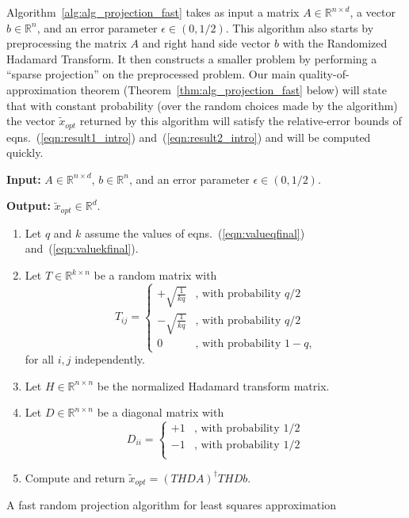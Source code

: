 \documentclass[11pt]{article}
\begin{document}
Algorithm~\ref{alg:alg_projection_fast} takes as input a matrix $A \in \mathbb{R}^{n \times d}$, a vector $b \in \mathbb{R}^n$, and an error parameter $\epsilon \in (0,1/2)$. This algorithm also starts by preprocessing the matrix $A$ and right hand side vector $b$ with the Randomized Hadamard Transform. It then constructs a smaller problem by performing a ``sparse projection'' on the preprocessed problem. Our main quality-of-approximation theorem (Theorem~\ref{thm:alg_projection_fast} below) will state that with constant probability (over the random choices made by the algorithm) the vector
$\tilde{x}_{opt}$ returned by this algorithm will satisfy the relative-error bounds of eqns.~(\ref{eqn:result1_intro}) and~(\ref{eqn:result2_intro}) and will be computed quickly.

\begin{algorithm}[h]
\begin{framed}

\textbf{Input:} $A \in \mathbb{R}^{n \times d}$, $b \in \mathbb{R}^n$, and an error parameter $\epsilon \in (0,1/2)$.

\vspace{0.1in}

\textbf{Output:} $\tilde{x}_{opt} \in \mathbb{R}^d$.

\begin{enumerate}

\item Let $q$ and $k$ assume the values of eqns.~(\ref{eqn:valueqfinal}) and~(\ref{eqn:valuekfinal}).

\item Let $T \in \mathbb{R}^{k \times n}$ be a random matrix with
$$
T_{ij}
            = \left\{\begin{array}{ll}
                        +\sqrt{\frac{1}{kq}}& \mbox{, with probability $q/2$} \\
                        -\sqrt{\frac{1}{kq}}& \mbox{, with probability $q/2$} \\
                        0                   & \mbox{, with probability $1-q$,}
                     \end{array}
              \right.
$$
for all $i,j$ independently.
\item Let $H \in \mathbb{R}^{n\times n}$ be the normalized Hadamard transform
matrix.

\item Let $D \in \mathbb{R}^{n \times n}$ be a diagonal matrix with
$$
D_{ii}
            = \left\{ \begin{array}{ll}
                         +1 & \mbox{, with probability $1/2$} \\
                         -1 & \mbox{, with probability $1/2$} \\
                      \end{array}
              \right.
$$
\item
Compute and return
$\tilde{x}_{opt}
   = \left(THDA\right)^{\dagger}THDb$.
\end{enumerate}

\end{framed}
\caption{A fast random projection algorithm for least squares
approximation} \label{alg:alg_projection_fast}
\end{algorithm}
\end{document}
